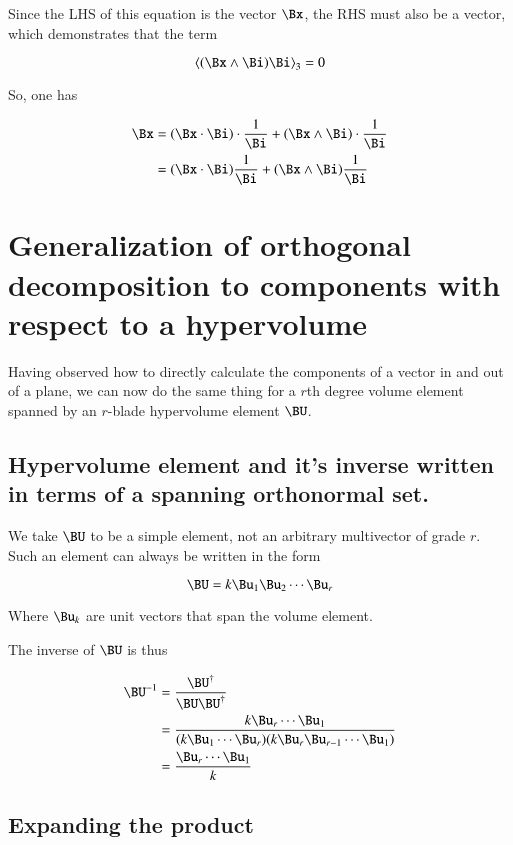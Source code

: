 \documentclass{article}
\begin{document}
Since the LHS of this equation is the vector $\Bx$, the RHS must
also be a vector, which demonstrates that the term

\[
\left<(\Bx \wedge \Bi) \Bi\right>_3 = 0
\]

So, one has

\begin{align*}
\Bx 
&=
{(\Bx \cdot \Bi) \cdot \frac{1}{\Bi}} + {(\Bx \wedge \Bi) \cdot \frac{1}{\Bi}} \\
&=
{(\Bx \cdot \Bi) \frac{1}{\Bi}} + {(\Bx \wedge \Bi) \frac{1}{\Bi}} \\
\end{align*}

\section{ Generalization of orthogonal decomposition to components with respect to a hypervolume }

Having observed how to directly calculate the components of a vector in and out of a plane, we can now do the
same thing for a $r$th degree volume element spanned by an $r$-blade hypervolume element $\BU$.

\subsection{ Hypervolume element and it's inverse written in terms of a spanning orthonormal set. }
We take $\BU$ to be a simple element, not an arbitrary multivector of grade $r$.  Such an element can 
always be written in the form

\[
\BU = k \Bu_1 \Bu_2 \cdots \Bu_r
\]

Where $\Bu_k$ are unit vectors that span the volume element.

The inverse of $\BU$ is thus

\begin{align*}
\BU^{-1}
&= \frac{\BU^\dagger}{\BU \BU^\dagger} \\
&= \frac{k \Bu_r \cdots \Bu_1}{(k \Bu_1 \cdots \Bu_r)(k \Bu_r \Bu_{r-1} \cdots \Bu_1)} \\
&= \frac{\Bu_r \cdots \Bu_1}{k} \\
\end{align*}

\subsection{ Expanding the product }
\end{document}
